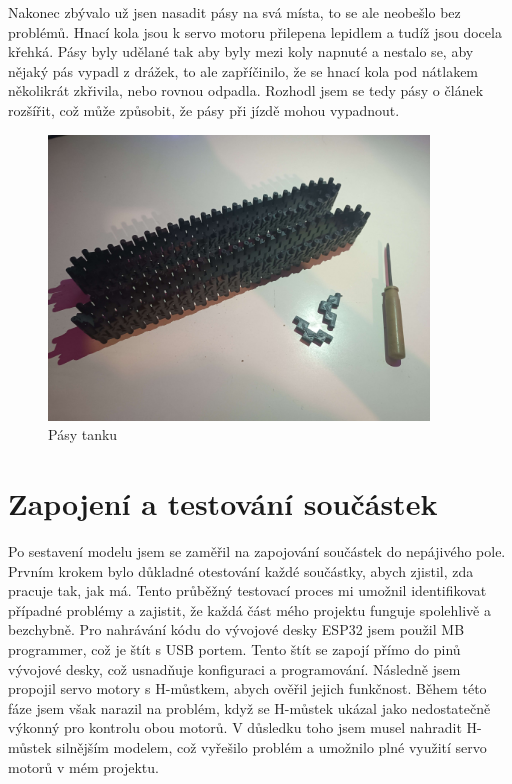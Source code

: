 \documentclass[12pt, a4paper,
oneside
openany
]{report}
\begin{document}
\noindent Nakonec zbývalo už jsen nasadit pásy na svá místa, to se ale neobešlo bez problémů. Hnací kola jsou k servo motoru přilepena lepidlem a tudíž jsou docela křehká. Pásy byly udělané tak aby byly mezi koly napnuté a nestalo se, aby nějaký pás vypadl z drážek, to ale zapříčinilo, že se hnací kola pod nátlakem několikrát zkřivila, nebo rovnou odpadla. Rozhodl jsem se tedy pásy o článek rozšířit, což může způsobit, že pásy při jízdě mohou vypadnout.

\vspace*{0.05\textheight}
	\begin{figure}[h]
		\centering 
		\includegraphics[width=0.9\textwidth]{image/pasy2.jpg} %
		\caption{Pásy tanku} 
	\end{figure}

\newpage
 \section{Zapojení a testování součástek}
 \noindent Po sestavení modelu jsem se zaměřil na zapojování součástek do nepájivého pole. Prvním krokem bylo důkladné otestování každé součástky, abych zjistil, zda pracuje tak, jak má. Tento průběžný testovací proces mi umožnil identifikovat případné problémy a zajistit, že každá část mého projektu funguje spolehlivě a bezchybně. Pro nahrávání kódu do vývojové desky ESP32 jsem použil MB programmer, což je štít s USB portem. Tento štít se zapojí přímo do pinů vývojové desky, což usnadňuje konfiguraci a programování. Následně jsem propojil servo motory s H-můstkem, abych ověřil jejich funkčnost. Během této fáze jsem však narazil na problém, když se H-můstek ukázal jako nedostatečně výkonný pro kontrolu obou motorů. V důsledku toho jsem musel nahradit H-můstek silnějším modelem, což vyřešilo problém a umožnilo plné využití servo motorů v mém projektu. 
\end{document}
